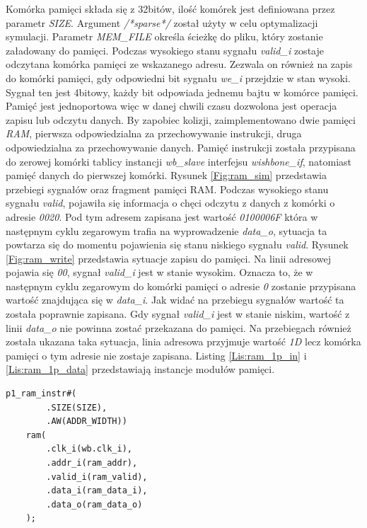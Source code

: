 \documentclass[11pt,a4paper]{article}
\begin{document}
		Komórka pamięci składa się z 32bitów, ilość komórek jest definiowana przez parametr \textit{SIZE}. Argument \textit{/*sparse*/} został użyty w celu optymalizacji symulacji. Parametr \textit{MEM\_FILE} określa ścieżkę do pliku, który zostanie załadowany do pamięci. Podczas wysokiego stanu sygnału \textit{valid\_i} zostaje odczytana komórka pamięci ze wskazanego adresu. Zezwala on również na zapis do komórki pamięci, gdy odpowiedni bit sygnału \textit{we\_i} przejdzie w stan wysoki. Sygnał ten jest 4bitowy, każdy bit odpowiada jednemu bajtu w komórce pamięci. Pamięć jest jednoportowa więc w danej chwili czasu dozwolona jest operacja zapisu lub odczytu danych. By zapobiec kolizji, zaimplementowano dwie pamięci \textit{RAM}, pierwsza odpowiedzialna za przechowywanie instrukcji, druga odpowiedzialna za przechowywanie danych. Pamięć instrukcji została przypisana do zerowej komórki tablicy instancji \textit{wb\_slave} interfejsu \textit{wishbone\_if}, natomiast pamięć danych do pierwszej komórki. Rysunek \ref{Fig:ram_sim} przedstawia przebiegi sygnałów oraz fragment pamięci RAM. Podczas wysokiego stanu sygnału \textit{valid}, pojawiła się informacja o chęci odczytu z danych z komórki o adresie \textit{0020}. Pod tym adresem zapisana jest wartość \textit{0100006F} która w następnym cyklu zegarowym trafia na wyprowadzenie \textit{data\_o}, sytuacja ta powtarza się do momentu pojawienia się stanu niskiego sygnału \textit{valid}. Rysunek \ref{Fig:ram_write} przedstawia sytuacje zapisu do pamięci. Na linii adresowej pojawia się \textit{00}, sygnał \textit{valid\_i} jest w stanie wysokim. Oznacza to, że w następnym cyklu zegarowym do komórki pamięci o adresie \textit{0} zostanie przypisana wartość znajdująca się w \textit{data\_i}. Jak widać na przebiegu sygnałów wartość ta została poprawnie zapisana. Gdy sygnał \textit{valid\_i} jest w stanie niskim, wartość z linii \textit{data\_o} nie powinna zostać przekazana do pamięci. Na przebiegach również została ukazana taka sytuacja, linia adresowa przyjmuje wartość \textit{1D} lecz komórka pamięci o tym adresie nie zostaje zapisana. Listing \ref{Lis:ram_1p_in} i \ref{Lis:ram_1p_data} przedstawiają instancje modułów pamięci.\\
\begin{minipage}{.49\textwidth}
\begin{scriptsize}
\begin{lstlisting}[label=Lis:ram_1p_in,caption=Instancja pamięci instrukcji]
    p1_ram_instr#(
        .SIZE(SIZE),
        .AW(ADDR_WIDTH))
    ram(
        .clk_i(wb.clk_i),
        .addr_i(ram_addr),
        .valid_i(ram_valid),
        .data_i(ram_data_i),
        .data_o(ram_data_o)
    );
\end{lstlisting}
\end{scriptsize}
\end{minipage} \hspace{.02\textwidth}
\end{document}
